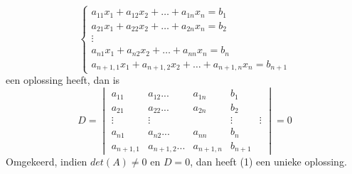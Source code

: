 \documentclass[12pt]{article}
\begin{document}
\begin{enumerate}
\begin{equation}
\begin{cases}
                a_{11}x_1+a_{12}x_2+\dots + a_{1n}x_n = b_1 \\ 
                a_{21}x_1+a_{22}x_2+\dots + a_{2n}x_n = b_2 \\ 
                \vdots \\
                a_{n1}x_1+a_{n2}x_2+\dots + a_{nn}x_n = b_n \\
                a_{n+1,1}x_1+a_{n+1,2}x_2+\dots+ a_{n+1,n}x_n = b_{n+1} 
            \end{cases}
            \end{equation}
            een oplossing heeft, dan is $$D=\begin{vmatrix}
                a_{11} & a_{12}... & a_{1n} & b_1 \\
                a_{21} & a_{22}... & a_{2n} & b_2 \\
                \vdots & \vdots & & \vdots & \vdots \\
                a_{n1} & a_{n2}... & a_{nn} & b_n \\ 
                a_{n+1,1} & a_{n+1,2}... & a_{n+1,n} & b_{n+1}
            \end{vmatrix}=0$$ Omgekeerd, indien $det(A) \neq 0$ en $D=0$, dan heeft (1) een unieke oplossing.
    \end{enumerate}
\end{document}
